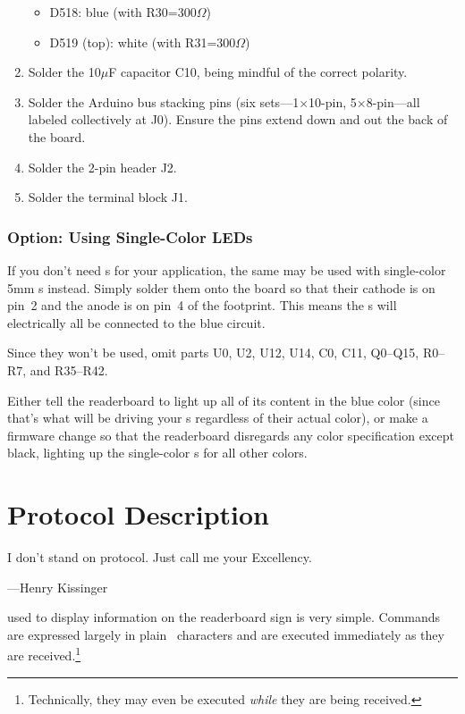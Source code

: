 \begin{enumerate}
\begin{itemize}
			\item D518: blue (with R30=300$\Omega$)
			\item D519 (top): white (with R31=300$\Omega$)
		\end{itemize}
	\item Solder the 10$\mu$F capacitor C10, being mindful of the correct polarity.
	\item Solder the Arduino bus stacking pins (six sets---1$\times$10-pin, 5$\times$8-pin---all labeled collectively at J0).
		Ensure the pins extend down and out the back of the board.
	\item Solder the 2-pin header J2.
	\item Solder the terminal block J1.
\end{enumerate}


\subsection{Option: Using Single-Color LEDs}
If you don't need  s for your application, the same 
may be used with single-color 5mm s instead. Simply solder them onto the board so
that their cathode is on pin~2 and the anode is on pin~4 of the  footprint. This
means the s will electrically all be connected to the blue circuit. 

Since they won't be used, omit parts U0, U2, U12, U14, C0, C11, Q0--Q15, R0--R7, and R35--R42.

Either tell the readerboard to light up all of its content in the blue color (since that's what
will be driving your s regardless of their actual color), or make a firmware change
so that the readerboard disregards any color specification except black, lighting up the single-color
s for all other colors.

                                                      
%
\chapter{Protocol Description}\label{chap:protocol}
{\setlength{\epigraphwidth}{.5\textwidth}
\epigraph{I don't stand on protocol. Just call me your Excellency.}{---Henry Kissinger}}
 used to display information on the readerboard sign is very simple.
Commands are expressed largely in plain \ascii\ characters and are executed immediately
as they are received.\footnote{Technically, they may even be executed \emph{while} they
are being received.}

